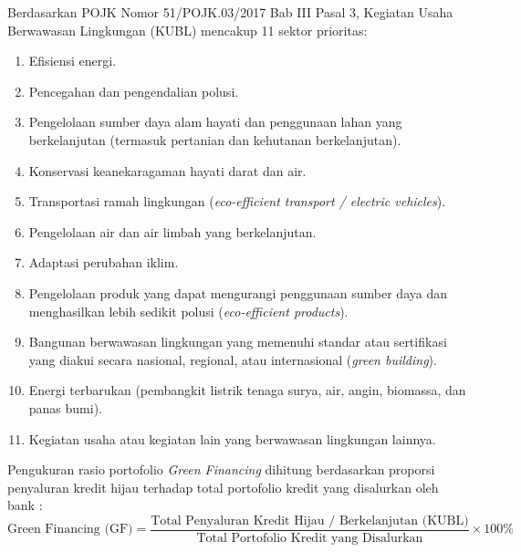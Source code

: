 \documentclass[12pt,a4paper]{article}
\numberwithin{equation}{section}
\begin{document}
\noindent
Berdasarkan POJK Nomor 51/POJK.03/2017 Bab III Pasal 3, Kegiatan Usaha Berwawasan Lingkungan (KUBL) mencakup 11 sektor prioritas:
\begin{enumerate}
  \item Efisiensi energi.
  \item Pencegahan dan pengendalian polusi.
  \item Pengelolaan sumber daya alam hayati dan penggunaan lahan yang berkelanjutan (termasuk pertanian dan kehutanan berkelanjutan).
  \item Konservasi keanekaragaman hayati darat dan air.
  \item Transportasi ramah lingkungan (\emph{eco-efficient transport / electric vehicles}).
  \item Pengelolaan air dan air limbah yang berkelanjutan.
  \item Adaptasi perubahan iklim.
  \item Pengelolaan produk yang dapat mengurangi penggunaan sumber daya dan menghasilkan lebih sedikit polusi (\emph{eco-efficient products}).
  \item Bangunan berwawasan lingkungan yang memenuhi standar atau sertifikasi yang diakui secara nasional, regional, atau internasional (\emph{green building}).
  \item Energi terbarukan (pembangkit listrik tenaga surya, air, angin, biomassa, dan panas bumi).
  \item Kegiatan usaha atau kegiatan lain yang berwawasan lingkungan lainnya.
\end{enumerate}

\noindent
Pengukuran rasio portofolio \emph{Green Financing} dihitung berdasarkan proporsi penyaluran kredit hijau terhadap total portofolio kredit yang disalurkan oleh bank \citep{Pramono2022, Sun2021}:
\begin{equation}
  \text{Green Financing (GF)} = \frac{\text{Total Penyaluran Kredit Hijau / Berkelanjutan (KUBL)}}{\text{Total Portofolio Kredit yang Disalurkan}} \times 100\%
\end{equation}
\end{document}
